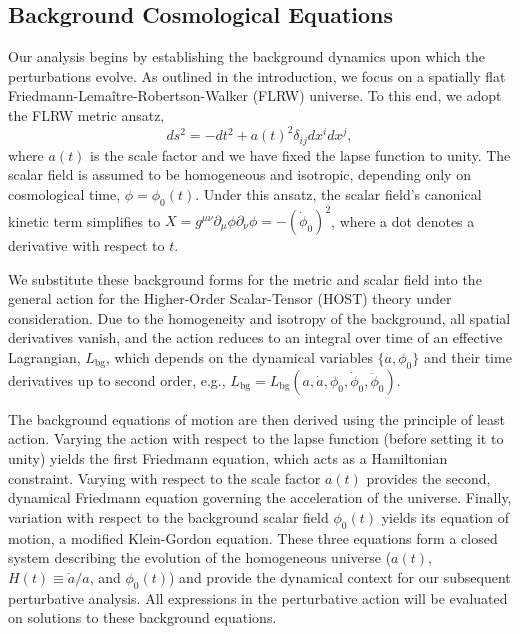 \documentclass[twocolumn]{aastex631}
\begin{document}
\subsection{Background Cosmological Equations}
Our analysis begins by establishing the background dynamics upon which the perturbations evolve. As outlined in the introduction, we focus on a spatially flat Friedmann-Lema\^itre-Robertson-Walker (FLRW) universe. To this end, we adopt the FLRW metric ansatz,
\begin{equation}
ds^2 = -dt^2 + a(t)^2 \delta_{ij} dx^i dx^j,
\end{equation}
where $a(t)$ is the scale factor and we have fixed the lapse function to unity. The scalar field is assumed to be homogeneous and isotropic, depending only on cosmological time, $\phi = \phi_0(t)$. Under this ansatz, the scalar field's canonical kinetic term simplifies to $X = g^{\mu\nu}\partial_\mu\phi\partial_\nu\phi = -(\dot{\phi}_0)^2$, where a dot denotes a derivative with respect to $t$.

We substitute these background forms for the metric and scalar field into the general action for the Higher-Order Scalar-Tensor (HOST) theory under consideration. Due to the homogeneity and isotropy of the background, all spatial derivatives vanish, and the action reduces to an integral over time of an effective Lagrangian, $L_{\text{bg}}$, which depends on the dynamical variables $\{a, \phi_0\}$ and their time derivatives up to second order, e.g., $L_{\text{bg}} = L_{\text{bg}}(a, \dot{a}, \phi_0, \dot{\phi}_0, \ddot{\phi}_0)$.

The background equations of motion are then derived using the principle of least action. Varying the action with respect to the lapse function (before setting it to unity) yields the first Friedmann equation, which acts as a Hamiltonian constraint. Varying with respect to the scale factor $a(t)$ provides the second, dynamical Friedmann equation governing the acceleration of the universe. Finally, variation with respect to the background scalar field $\phi_0(t)$ yields its equation of motion, a modified Klein-Gordon equation. These three equations form a closed system describing the evolution of the homogeneous universe ($a(t)$, $H(t) \equiv \dot{a}/a$, and $\phi_0(t)$) and provide the dynamical context for our subsequent perturbative analysis. All expressions in the perturbative action will be evaluated on solutions to these background equations.
\end{document}
